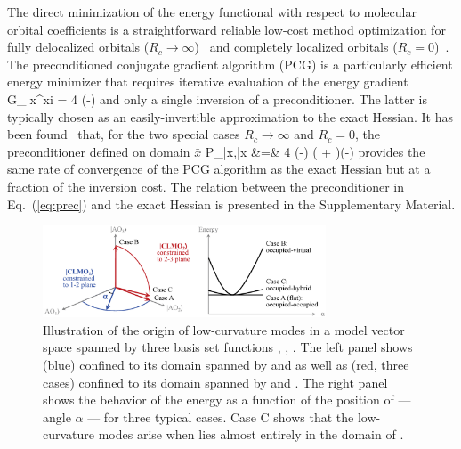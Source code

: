 \documentclass[10pt,amsmath,twocolumn,aps,prl,superscriptaddress,floatfix]{revtex4-1}
\begin{document}
The direct minimization of the energy functional with respect to molecular orbital coefficients is a straightforward reliable low-cost method optimization for fully delocalized orbitals ($R_c \rightarrow \infty$)~\cite{galli1992large, vandevondele2003efficient, van2002geometric} and completely localized orbitals ($R_c = 0$)~\cite{khaliullin2013efficient}. 
The preconditioned conjugate gradient algorithm (PCG) is a particularly efficient energy minimizer that requires iterative evaluation of the energy gradient
%
\bea \label{eq:grad}
{G_{\bar{x}\mu}}^{xi} \equiv {} = 4  (-)  
\eea
%
and only a single inversion of a preconditioner. The latter is typically chosen as an easily-invertible approximation to the exact Hessian. It has been found~\cite{vandevondele2003efficient,khaliullin2013efficient} that, for the two special cases $R_c \rightarrow \infty$ and $R_c = 0$, the preconditioner defined on domain $\bar{x}$
%
\bea \label{eq:prec}
P_{\bar{x}\mu,\bar{x}\nu} &=& 4  (-) ( + )(-)  
\eea
%
provides the same rate of convergence of the PCG algorithm as the exact Hessian but at a fraction of the inversion cost. The relation between the preconditioner in Eq.~(\ref{eq:prec}) and the exact Hessian is presented in the Supplementary Material. 

\begin{figure}
\centering
\includegraphics[width=0.75\textwidth]{modes}
\caption{Illustration of the origin of low-curvature modes in a model vector space spanned by three basis set functions , , . The left panel shows  (blue) confined to its domain spanned by  and  as well as   (red, three cases) confined to its domain spanned by  and . The right panel shows the behavior of the energy as a function of the position of  --- angle $\alpha$ --- for three typical cases. Case C shows that the low-curvature modes arise when   lies almost entirely in the domain of .}
\label{fig:modes}
\end{figure}
\end{document}

